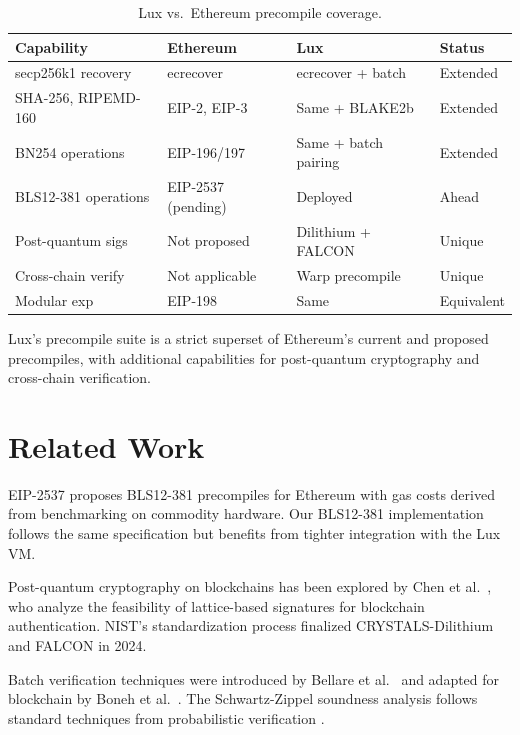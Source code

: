 \documentclass[11pt,a4paper]{article}
\begin{document}
\begin{table}[H]
\centering
\caption{Lux vs.\ Ethereum precompile coverage.}
\label{tab:eth_comparison}
\begin{tabular}{llll}
\toprule
\textbf{Capability} & \textbf{Ethereum} & \textbf{Lux} & \textbf{Status} \\
\midrule
secp256k1 recovery & ecrecover & ecrecover + batch & Extended \\
SHA-256, RIPEMD-160 & EIP-2, EIP-3 & Same + BLAKE2b & Extended \\
BN254 operations & EIP-196/197 & Same + batch pairing & Extended \\
BLS12-381 operations & EIP-2537 (pending) & Deployed & Ahead \\
Post-quantum sigs & Not proposed & Dilithium + FALCON & Unique \\
Cross-chain verify & Not applicable & Warp precompile & Unique \\
Modular exp & EIP-198 & Same & Equivalent \\
\bottomrule
\end{tabular}
\end{table}

Lux's precompile suite is a strict superset of Ethereum's current and proposed precompiles, with additional capabilities for post-quantum cryptography and cross-chain verification.

\section{Related Work}\label{sec:related}

EIP-2537 \cite{eip2537} proposes BLS12-381 precompiles for Ethereum with gas costs derived from benchmarking on commodity hardware. Our BLS12-381 implementation follows the same specification but benefits from tighter integration with the Lux VM.

Post-quantum cryptography on blockchains has been explored by Chen et al.\ \cite{chen2021pqblockchain}, who analyze the feasibility of lattice-based signatures for blockchain authentication. NIST's standardization process \cite{nistpqc2024} finalized CRYSTALS-Dilithium and FALCON in 2024.

Batch verification techniques were introduced by Bellare et al.\ \cite{bellare1998batch} and adapted for blockchain by Boneh et al.\ \cite{boneh2018compact}. The Schwartz-Zippel soundness analysis follows standard techniques from probabilistic verification \cite{schwartz1980fast}.
\end{document}
